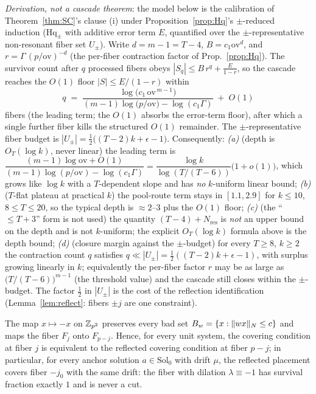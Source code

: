 \begin{proposition}
\label{prop:depth}
\emph{Derivation, not a cascade theorem}: the model below is the
calibration of Theorem~\ref{thm:SC}'s clause (i) under
Proposition~\ref{prop:Hq}'s $\pm$-reduced induction (Hq$_\pm$ with additive
error term $E$, quantified over the $\pm$-representative non-resonant fiber
set $U_\pm$). Write $d=m-1=T-4$, $B=c_1\mathrm{ov}^{d}$, and
$r=\Gamma\,(p/\mathrm{ov})^{-d}$ (the per-fiber contraction factor of
Prop.~\ref{prop:Hq}). The survivor count after $q$ processed fibers obeys
$|S_q|\le B\,r^{q}+\tfrac{E}{1-r}$, so the cascade reaches the $O(1)$ floor
$|S|\le E/(1-r)$ within
\[
q\;=\;\frac{\log\!\bigl(c_1\,\mathrm{ov}^{\,m-1}\bigr)}
{(m-1)\log\!\bigl(p/\mathrm{ov}\bigr)-\log(c_1\Gamma)}\;+\;O(1)
\]
fibers (the leading term; the $O(1)$ absorbs the error-term floor), after
which a single further fiber kills the structured $O(1)$ remainder. The
$\pm$-representative fiber budget is $|U_\pm|=\tfrac12\bigl((T-2)k+\epsilon-1\bigr)$.
Consequently:
\emph{(a)} (depth is $O_T(\log k)$, never linear) the leading term is
$\dfrac{(m-1)\log\mathrm{ov}+O(1)}{(m-1)\log(p/\mathrm{ov})-\log(c_1\Gamma)}
=\dfrac{\log k}{\log(T/(T-6))}\bigl(1+o(1)\bigr)$, which grows like $\log k$
with a $T$-dependent slope and has \emph{no} $k$-uniform linear bound;
\emph{(b)} ($T$-flat plateau at practical $k$) the pool-route term stays in
$[1.1,2.9]$ for $k\le10$, $8\le T\le20$, so the typical depth is
$\approx 2$--$3$ plus the $O(1)$ floor;
\emph{(c)} (the ``$\le T+3$'' form is not used) the quantity
$(T-4)+N_{\mathrm{res}}$ is \emph{not} an upper bound on
the depth and is not $k$-uniform; the explicit
$O_T(\log k)$ formula above is the depth bound;
\emph{(d)} (closure margin against the $\pm$-budget) for every $T\ge8$,
$k\ge2$ the contraction count $q$ satisfies $q\ll|U_\pm|=\tfrac12((T-2)k+\epsilon-1)$,
with surplus growing linearly in $k$; equivalently the per-fiber factor $r$
may be as large as $\bigl(T/(T-6)\bigr)^{m-1}$ (the threshold value) and the
cascade still closes within the $\pm$-budget. The factor $\tfrac12$ in
$|U_\pm|$ is the cost of the reflection identification
(Lemma~\ref{lem:reflect}: fibers $\pm j$ are one constraint).
\end{proposition}

\begin{lemma}\label{lem:reflect}
The map $x\mapsto-x$ on $\mathbb{Z}_{p^2}$ preserves every bad set
$B_w=\{x:\lVert wx \rVert_{N}\le c\}$ and maps the fiber $F_j$ onto $F_{p-j}$. Hence,
for every unit system, the covering condition at fiber $j$ is
equivalent to the reflected covering condition at fiber $p-j$; in
particular, for every anchor solution $a\in\mathrm{Sol}_0$ with drift
$\mu$, the reflected placement covers fiber $-j_0$ with the same drift:
the fiber with dilation $\lambda\equiv-1$ has survival fraction exactly
$1$ and is never a cut.
\end{lemma}

